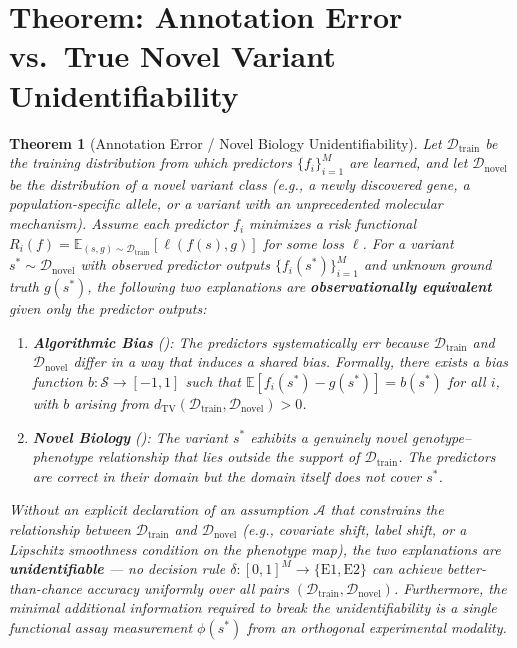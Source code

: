 \documentclass[11pt,a4paper]{article}
\newtheorem{theorem}{Theorem}[section]
\theoremstyle{definition}
\newcommand{\E}{\mathbb{E}}
\newcommand{\calA}{\mathcal{A}}
\newcommand{\calD}{\mathcal{D}}
\newcommand{\calS}{\mathcal{S}}
\newcommand{\novelbio}{}
\newcommand{\annobias}{}
\begin{document}
\section{Theorem: Annotation Error vs.\ True Novel Variant Unidentifiability}
\label{sec:thm3}
\begin{theorem}[Annotation Error / Novel Biology Unidentifiability]
\label{thm:unidentifiability}
Let $\calD_{\text{train}}$ be the training distribution from which predictors $\{f_i\}_{i=1}^{M}$ are learned, and let $\calD_{\text{novel}}$ be the distribution of a novel variant class (e.g., a newly discovered gene, a population-specific allele, or a variant with an unprecedented molecular mechanism).
Assume each predictor $f_i$ minimizes a risk functional $R_i(f) = \E_{(s,g) \sim \calD_{\text{train}}}[\ell(f(s), g)]$ for some loss $\ell$.
For a variant $s^* \sim \calD_{\text{novel}}$ with observed predictor outputs $\{f_i(s^*)\}_{i=1}^{M}$ and unknown ground truth $g(s^*)$, the following two explanations are \textbf{observationally equivalent} given only the predictor outputs:
\begin{enumerate}[leftmargin=*,label=(\textbf{E\arabic*})]
    \item \textbf{Algorithmic Bias} (\annobias{}): The predictors systematically err because $\calD_{\text{train}}$ and $\calD_{\text{novel}}$ differ in a way that induces a shared bias. Formally, there exists a bias function $b: \calS \to [-1,1]$ such that $\E[f_i(s^*) - g(s^*)] = b(s^*)$ for all $i$, with $b$ arising from $d_{\text{TV}}(\calD_{\text{train}}, \calD_{\text{novel}}) > 0$.
    \item \textbf{Novel Biology} (\novelbio{}): The variant $s^*$ exhibits a genuinely novel genotype--phenotype relationship that lies outside the support of $\calD_{\text{train}}$. The predictors are \textit{correct in their domain} but the domain itself does not cover $s^*$.
\end{enumerate}
Without an explicit declaration of an assumption $\calA$ that constrains the relationship between $\calD_{\text{train}}$ and $\calD_{\text{novel}}$ (e.g., covariate shift, label shift, or a Lipschitz smoothness condition on the phenotype map), the two explanations are \textbf{unidentifiable} — no decision rule $\delta: [0,1]^M \to \{\text{E1}, \text{E2}\}$ can achieve better-than-chance accuracy uniformly over all pairs $(\calD_{\text{train}}, \calD_{\text{novel}})$.
Furthermore, the minimal additional information required to break the unidentifiability is a single functional assay measurement $\phi(s^*)$ from an orthogonal experimental modality.
\end{theorem}
\end{document}
